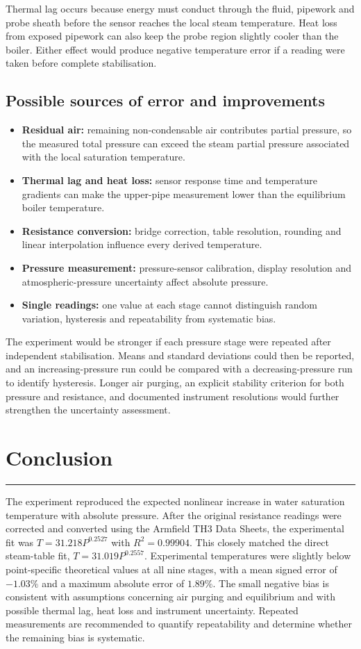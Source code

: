 \documentclass[11pt,a4paper]{article}
\newcommand{\sectionrule}{\vspace{-2pt}\color{rulegray}\hrule\color{black}\vspace{5pt}}
\begin{document}
Thermal lag occurs because energy must conduct through the fluid, pipework and
probe sheath before the sensor reaches the local steam temperature. Heat loss
from exposed pipework can also keep the probe region slightly cooler than the
boiler. Either effect would produce negative temperature error if a reading were
taken before complete stabilisation.

\subsection{Possible sources of error and improvements}
\begin{itemize}
  \item \textbf{Residual air:} remaining non-condensable air contributes partial
        pressure, so the measured total pressure can exceed the steam partial
        pressure associated with the local saturation temperature.
  \item \textbf{Thermal lag and heat loss:} sensor response time and temperature
        gradients can make the upper-pipe measurement lower than the equilibrium
        boiler temperature.
  \item \textbf{Resistance conversion:} bridge correction, table resolution,
        rounding and linear interpolation influence every derived temperature.
  \item \textbf{Pressure measurement:} pressure-sensor calibration, display
        resolution and atmospheric-pressure uncertainty affect absolute pressure.
  \item \textbf{Single readings:} one value at each stage cannot distinguish
        random variation, hysteresis and repeatability from systematic bias.
\end{itemize}

The experiment would be stronger if each pressure stage were repeated after
independent stabilisation. Means and standard deviations could then be reported,
and an increasing-pressure run could be compared with a decreasing-pressure run
to identify hysteresis. Longer air purging, an explicit stability criterion for
both pressure and resistance, and documented instrument resolutions would
further strengthen the uncertainty assessment.

\section{Conclusion}
\sectionrule
The experiment reproduced the expected nonlinear increase in water saturation
temperature with absolute pressure. After the original resistance readings were
corrected and converted using the Armfield TH3 Data Sheets, the experimental
fit was $T=31.218P^{0.2527}$ with $R^2=0.99904$. This closely matched the direct
steam-table fit, $T=31.019P^{0.2557}$. Experimental temperatures were slightly
below point-specific theoretical values at all nine stages, with a mean signed
error of $-1.03\%$ and a maximum absolute error of $1.89\%$. The small negative
bias is consistent with assumptions concerning air purging and equilibrium and
with possible thermal lag, heat loss and instrument uncertainty. Repeated
measurements are recommended to quantify repeatability and determine whether
the remaining bias is systematic.
\end{document}
